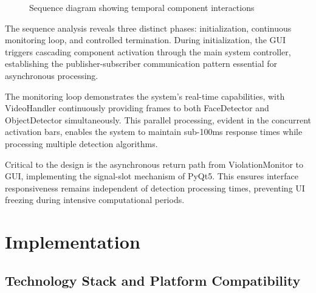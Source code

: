 \documentclass[conference]{IEEEtran}
\begin{document}
\begin{figure}[H]
    \caption{Sequence diagram showing temporal component interactions}
\end{figure}

The sequence analysis reveals three distinct phases: initialization, continuous monitoring 
loop, and controlled termination. During initialization, the GUI triggers cascading component 
activation through the main system controller, establishing the publisher-subscriber 
communication pattern essential for asynchronous processing.

The monitoring loop demonstrates the system's real-time capabilities, with VideoHandler 
continuously providing frames to both FaceDetector and ObjectDetector simultaneously. 
This parallel processing, evident in the concurrent activation bars, enables the system 
to maintain sub-100ms response times while processing multiple detection algorithms.

Critical to the design is the asynchronous return path from ViolationMonitor to GUI, 
implementing the signal-slot mechanism of PyQt5. This ensures interface responsiveness 
remains independent of detection processing times, preventing UI freezing during intensive 
computational periods.

\section{Implementation}

\subsection{Technology Stack and Platform Compatibility}
\end{document}
